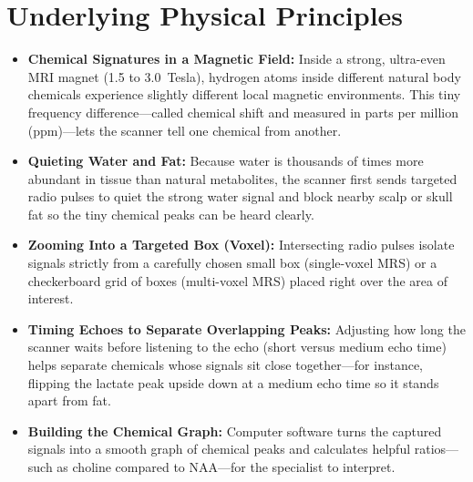 \section{Underlying Physical Principles}
\begin{itemize}
\item \textbf{Chemical Signatures in a Magnetic Field:} Inside a strong, ultra-even MRI magnet (1.5 to 3.0~Tesla), hydrogen atoms inside different natural body chemicals experience slightly different local magnetic environments. This tiny frequency difference---called chemical shift and measured in parts per million (ppm)---lets the scanner tell one chemical from another.
\item \textbf{Quieting Water and Fat:} Because water is thousands of times more abundant in tissue than natural metabolites, the scanner first sends targeted radio pulses to quiet the strong water signal and block nearby scalp or skull fat so the tiny chemical peaks can be heard clearly.
\item \textbf{Zooming Into a Targeted Box (Voxel):} Intersecting radio pulses isolate signals strictly from a carefully chosen small box (single-voxel MRS) or a checkerboard grid of boxes (multi-voxel MRS) placed right over the area of interest.
\item \textbf{Timing Echoes to Separate Overlapping Peaks:} Adjusting how long the scanner waits before listening to the echo (short versus medium echo time) helps separate chemicals whose signals sit close together---for instance, flipping the lactate peak upside down at a medium echo time so it stands apart from fat.
\item \textbf{Building the Chemical Graph:} Computer software turns the captured signals into a smooth graph of chemical peaks and calculates helpful ratios---such as choline compared to NAA---for the specialist to interpret.
\end{itemize}

